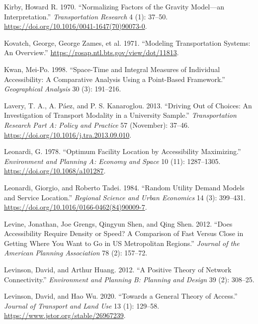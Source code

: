 \documentclass[
]{article}
\newlength{\cslhangindent}
\newenvironment{CSLReferences}[2] %
 {\begin{list}{}{%
  \setlength{\itemindent}{0pt}
  \setlength{\leftmargin}{0pt}
  \setlength{\parsep}{0pt}
  \ifodd #1
   \setlength{\leftmargin}{\cslhangindent}
   \setlength{\itemindent}{-1\cslhangindent}
  \fi
  \setlength{\itemsep}{#2\baselineskip}}}
 {\end{list}}
\begin{document}
\begin{CSLReferences}{1}{0}
Kirby, Howard R. 1970. {``Normalizing Factors of the Gravity Model---an
Interpretation.''} \emph{Transportation Research} 4 (1): 37--50.
\url{https://doi.org/10.1016/0041-1647(70)90073-0}.

Kovatch, George, George Zames, et al. 1971. {``Modeling Transportation
Systems: An Overview.''} \url{https://rosap.ntl.bts.gov/view/dot/11813}.

Kwan, Mei-Po. 1998. {``Space-Time and Integral Measures of Individual
Accessibility: A Comparative Analysis Using a Point-Based Framework.''}
\emph{Geographical Analysis} 30 (3): 191--216.

Lavery, T. A., A. Páez, and P. S. Kanaroglou. 2013. {``Driving Out of
Choices: {An} Investigation of Transport Modality in a University
Sample.''} \emph{Transportation Research Part A: Policy and Practice} 57
(November): 37--46. \url{https://doi.org/10.1016/j.tra.2013.09.010}.

Leonardi, G. 1978. {``Optimum Facility Location by Accessibility
Maximizing.''} \emph{Environment and Planning A: Economy and Space} 10
(11): 1287--1305. \url{https://doi.org/10.1068/a101287}.

Leonardi, Giorgio, and Roberto Tadei. 1984. {``Random Utility Demand
Models and Service Location.''} \emph{Regional Science and Urban
Economics} 14 (3): 399--431.
\url{https://doi.org/10.1016/0166-0462(84)90009-7}.

Levine, Jonathan, Joe Grengs, Qingyun Shen, and Qing Shen. 2012. {``Does
Accessibility Require Density or Speed? A Comparison of Fast Versus
Close in Getting Where You Want to Go in US Metropolitan Regions.''}
\emph{Journal of the American Planning Association} 78 (2): 157--72.

Levinson, David, and Arthur Huang. 2012. {``A Positive Theory of Network
Connectivity.''} \emph{Environment and Planning B: Planning and Design}
39 (2): 308--25.

Levinson, David, and Hao Wu. 2020. {``Towards a General Theory of
Access.''} \emph{Journal of Transport and Land Use} 13 (1): 129--58.
\url{https://www.jstor.org/stable/26967239}.


\end{CSLReferences}
\end{document}
